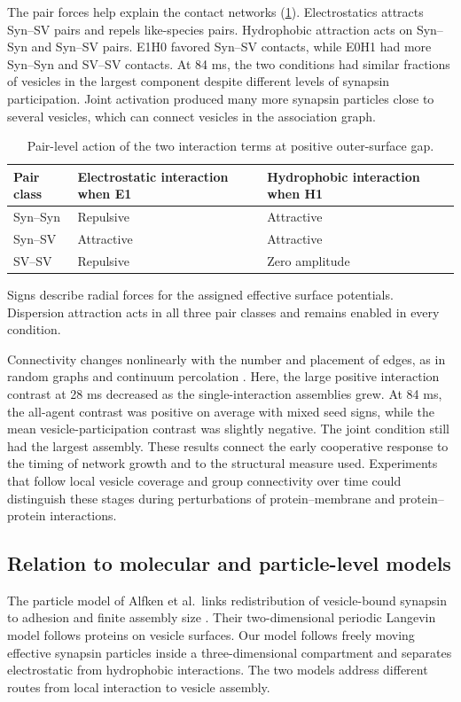 \documentclass[11pt,letterpaper]{article}
\begin{document}
The pair forces help explain the contact networks (\cref{tab:pair-scope}).
Electrostatics attracts Syn--SV pairs and repels like-species pairs.
Hydrophobic attraction acts on Syn--Syn and Syn--SV pairs. E1H0
favored Syn--SV contacts, while E0H1 had more Syn--Syn and SV--SV
contacts. At 84 ms, the two conditions had similar fractions of
vesicles in the largest component despite different levels of
synapsin participation. Joint activation produced many more synapsin
particles close to several vesicles, which can connect vesicles in
the association graph.

\begin{table}[htbp]\centering\small
\caption{Pair-level action of the two interaction terms at positive outer-surface gap.}
\label{tab:pair-scope}
\begin{tabular}{@{}lll@{}}\toprule
Pair class & Electrostatic interaction when E1 & Hydrophobic interaction when H1 \\
\midrule
Syn--Syn & Repulsive & Attractive \\
Syn--SV  & Attractive & Attractive \\
SV--SV   & Repulsive & Zero amplitude \\
\bottomrule\end{tabular}
\par\smallskip\raggedright
Signs describe radial forces for the assigned effective surface
potentials. Dispersion attraction acts in all three pair classes and
remains enabled in every condition.
\end{table}

Connectivity changes nonlinearly with the number and placement of
edges, as in random graphs and continuum percolation
\cite{NewmanStrogatzWatts2001,DallChristensen2002}. Here, the large
positive interaction contrast at 28 ms decreased as the
single-interaction assemblies grew. At 84 ms, the all-agent contrast
was positive on average with mixed seed signs, while the mean
vesicle-participation contrast was slightly negative. The joint
condition still had the largest assembly. These results connect the
early cooperative response to the timing of network growth and to the
structural measure used. Experiments that follow local vesicle
coverage and group connectivity over time could distinguish these
stages during perturbations of protein--membrane and protein--protein
interactions.

\subsection{Relation to molecular and particle-level models}
The particle model of Alfken et al.\ links redistribution of vesicle-bound
synapsin to adhesion and finite assembly size \cite{Alfken2024}. Their
two-dimensional periodic Langevin model follows proteins on vesicle
surfaces. Our model follows freely moving effective synapsin particles
inside a three-dimensional compartment and separates electrostatic from
hydrophobic interactions. The two models address different routes from
local interaction to vesicle assembly.
\end{document}
